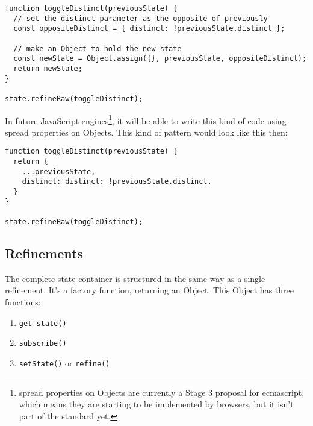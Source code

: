 \begin{minipage}{\linewidth}
\begin{lstlisting}[caption={Toggling the {\tt DISTINCT} parameter},label={lst:is-core-raw}]
function toggleDistinct(previousState) {
  // set the distinct parameter as the opposite of previously
  const oppositeDistinct = { distinct: !previousState.distinct };

  // make an Object to hold the new state
  const newState = Object.assign({}, previousState, oppositeDistinct);
  return newState;
}

state.refineRaw(toggleDistinct);
\end{lstlisting}
\end{minipage}

In future JavaScript engines\footnote{spread properties on Objects are currently a Stage 3 proposal for \acrshort{ecmascript}\cite{es-prop-spread}, which means they are starting to be implemented by browsers, but it isn't part of the standard yet.}, it will be able to write this kind of code using spread properties on Objects. This kind of pattern would look like this then:

\begin{minipage}{\linewidth}
\begin{lstlisting}[caption={Toggling the {\tt DISTINCT} parameter when Object spread is available},label={lst:is-core-raw-es2015}]
function toggleDistinct(previousState) {
  return {
    ...previousState,
    distinct: distinct: !previousState.distinct,
  }
}

state.refineRaw(toggleDistinct);
\end{lstlisting}
\end{minipage}

\subsection{Refinements}
\label{ssec:refinments}

The complete state container is structured in the same way as a single refinement. It's a factory function, returning an Object. This Object has three functions: 

\begin{enumerate}
  \item {\tt get state()}
  \item {\tt subscribe()}
  \item {\tt setState()} or {\tt refine()}
\end{enumerate}

